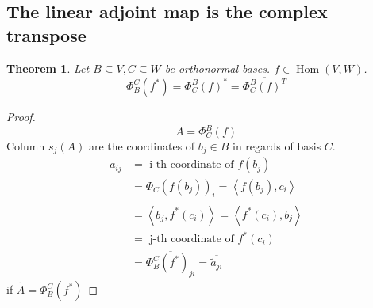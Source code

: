 \documentclass{article}
\newcounter{lecref}[section]
\numberwithin{lecref}{section}
\newtheorem{theorem}[lecref]{Theorem}
\newcommand{\ip}[2]{\left\langle#1,#2\right\rangle} %
\begin{document}
\subsection{The linear adjoint map is the complex transpose}
\begin{theorem} %
  Let $B \subseteq V, C \subseteq W$ be orthonormal bases. $f \in \operatorname{Hom}(V, W)$.
  \[ \Phi_B^C(f^*) = \Phi_C^B(f)^* = \overline{\Phi_C^B(f)^T} \]
\end{theorem}

\begin{proof}
  \[ A = \Phi_C^B(f) \]
  Column $s_j(A)$ are the coordinates of $b_j \in B$ in regards of basis $C$.
  \begin{align*}
    a_{ij} &= \text{ i-th coordinate of } f(b_j) \\
      &= \Phi_C(f(b_j))_i = \ip{f(b_j)}{c_i} \\
      &= \ip{b_j}{f^*(c_i)} = \overline{\ip{f^*(c_i)}{b_j}} \\
      &= \text{ j-th coordinate of } f^*(c_i) \\
      &= \overline{\Phi_B^C(f^*)_{ji}} = \overline{\tilde{a}_{ji}}
  \end{align*}
  if $\tilde A = \Phi_B^C(f^*)$
\end{proof}
\end{document}
